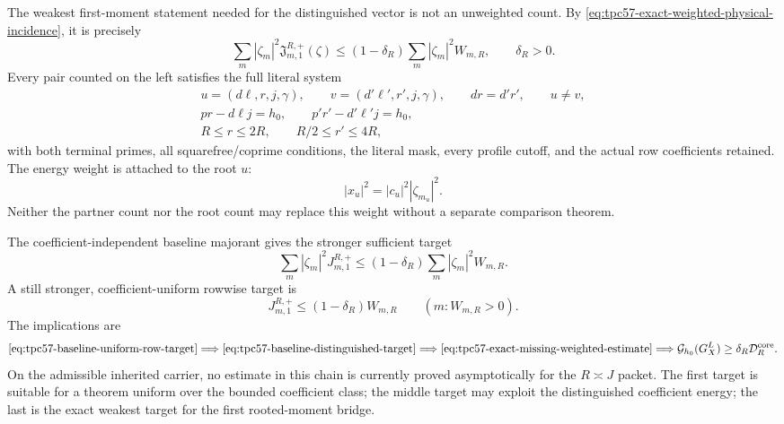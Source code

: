 The weakest first-moment statement needed for the distinguished vector is
not an unweighted count.  By
\eqref{eq:tpc57-exact-weighted-physical-incidence}, it is precisely
\begin{equation}
 \boxed{
 \sum_m|\zeta_m|^2
   \mathfrak J_{m,1}^{R,+}(\zeta)
 \le
 (1-\delta_R)
 \sum_m|\zeta_m|^2W_{m,R},
 \qquad
 \delta_R>0.}
 \label{eq:tpc57-exact-missing-weighted-estimate}
\end{equation}
Every pair counted on the left satisfies the full literal system
\begin{equation}
 \begin{gathered}
 u=(d\ell,r,j,\gamma),
 \qquad
 v=(d'\ell',r',j,\gamma),
 \qquad
 dr=d'r',\qquad u\ne v,\\
 pr-d\ell j=h_0,
 \qquad
 p'r'-d'\ell'j=h_0,\\
 R\le r\le2R,
 \qquad
 R/2\le r'\le4R,
 \end{gathered}
 \label{eq:tpc57-complete-factor-exchange-system}
\end{equation}
with both terminal primes, all squarefree/coprime conditions, the literal
mask, every profile cutoff, and the actual row coefficients retained.
The energy weight is attached to the root \(u\):
\begin{equation}
 |x_u|^2=|c_u|^2|\zeta_{m_u}|^2.
 \label{eq:tpc57-root-physical-weight}
\end{equation}
Neither the partner count nor the root count may replace this weight
without a separate comparison theorem.

The coefficient-independent baseline majorant gives the stronger sufficient
target
\begin{equation}
 \boxed{
 \sum_m|\zeta_m|^2J_{m,1}^{R,+}
 \le
 (1-\delta_R)
 \sum_m|\zeta_m|^2W_{m,R}.}
 \label{eq:tpc57-baseline-distinguished-target}
\end{equation}
A still stronger, coefficient-uniform rowwise target is
\begin{equation}
 J_{m,1}^{R,+}
 \le(1-\delta_R)W_{m,R}
 \qquad(m:W_{m,R}>0).
 \label{eq:tpc57-baseline-uniform-row-target}
\end{equation}
The implications are
\begin{equation}
 \eqref{eq:tpc57-baseline-uniform-row-target}
 \Longrightarrow
 \eqref{eq:tpc57-baseline-distinguished-target}
 \Longrightarrow
 \eqref{eq:tpc57-exact-missing-weighted-estimate}
 \Longrightarrow
 \mathcal G_{h_0}(G_X^L)
 \ge\delta_R\mathcal D_R^{\rm core}.
 \label{eq:tpc57-collision-target-hierarchy}
\end{equation}
On the admissible inherited carrier, no estimate in this chain is currently
proved asymptotically for the \(R\asymp J\) packet.
The first target is suitable for a theorem uniform over
the bounded coefficient class; the middle target may exploit the
distinguished coefficient energy; the last is the exact weakest target for
the first rooted-moment bridge.

